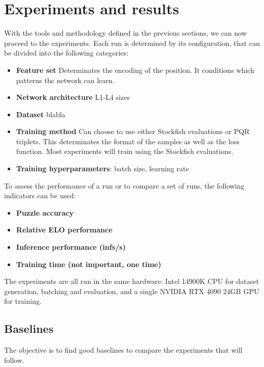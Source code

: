 \section{Experiments and results}

With the tools and methodology defined in the previous sections, we can now proceed to the experiments. Each run is determined by its configuration, that can be divided into the following categories:

\begin{itemize}
\item \textbf{Feature set} Determinates the encoding of the position. It conditions which patterns the network can learn.

\item \textbf{Network architecture} L1-L4 sizes

\item \textbf{Dataset} blabla

\item \textbf{Training method} Can choose to use either Stockfish evaluations or PQR triplets. This determinates the format of the samples as well as the loss function. Most experiments will train using the Stockfish evaluations.

\item \textbf{Training hyperparameters}: batch size, learning rate
\end{itemize}

To assess the performance of a run or to compare a set of runs, the following indicators can be used:

\begin{itemize}
\item \textbf{Puzzle accuracy}
\item \textbf{Relative ELO performance}
\item \textbf{Inference performance (infs/s)}
\item \textbf{Training time (not important, one time)}
\end{itemize}


The experiments are all run in the same hardware: Intel 14900K CPU for dataset generation, batching and evaluation, and a single NVIDIA RTX 4090 24GB GPU for training.

\subsection{Baselines}

The objective is to find good baselines to compare the experiments that will follow.

